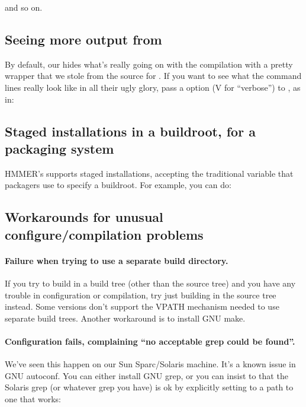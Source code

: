 and so on.

\subsection{Seeing more output from }

By default, our  hides what's really going on with the
compilation with a pretty wrapper that we stole from the source for
. If you want to see what the command lines really look like
in all their ugly glory, pass a  option (V for ``verbose'')
to , as in:

  \vspace{1ex}
  \vspace{1ex}


\subsection{Staged installations in a buildroot, for a packaging system}

HMMER's  supports staged installations, accepting
the traditional  variable that packagers use to specify
a buildroot. For example, you can do:

  \vspace{1ex}
  \vspace{1ex}




\subsection{Workarounds for unusual configure/compilation problems}

\paragraph{Failure when trying to use a
  separate build directory.}  If you try to build in a build tree
(other than the source tree) and you have any trouble in configuration
or compilation, try just building in the source tree instead. Some
 versions don't support the VPATH mechanism needed to use
separate build trees. Another workaround is to install GNU make.


\paragraph{Configuration fails, complaining ``no acceptable grep could
  be found''.} We've seen this happen on our Sun Sparc/Solaris
machine. It's a known issue in GNU autoconf. You can either install
GNU grep, or you can insist to  that the Solaris
grep (or whatever grep you have) is ok by explicitly setting
 to a path to one that works:

